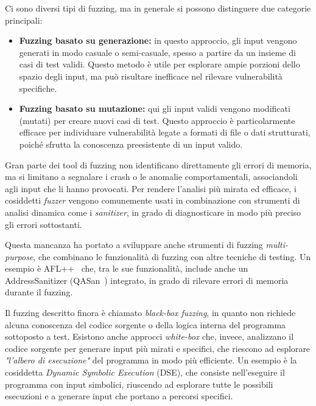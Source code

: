 \smallskip
Ci sono diversi tipi di fuzzing, ma in generale si possono distinguere due
categorie principali:

\begin{itemize}
  \item \textbf{Fuzzing basato su generazione:} in questo approccio, gli input vengono
    generati in modo casuale o semi-casuale, spesso a partire da un insieme di
    casi di test validi. Questo metodo è utile per esplorare ampie porzioni dello
    spazio degli input, ma può risultare inefficace nel rilevare vulnerabilità
    specifiche.

  \item \textbf{Fuzzing basato su mutazione:} qui gli input validi vengono
    modificati (mutati) per creare nuovi casi di test. Questo approccio è particolarmente
    efficace per individuare vulnerabilità legate a formati di file o dati strutturati,
    poiché sfrutta la conoscenza preesistente di un input valido.
\end{itemize}

Gran parte dei tool di fuzzing non identificano direttamente gli errori di memoria,
ma si limitano a segnalare i crash o le anomalie comportamentali, associandoli agli
input che li hanno provocati. Per rendere l'analisi più mirata ed efficace, i cosiddetti
\textit{fuzzer} vengono comunemente usati in combinazione con strumenti di
analisi dinamica come i \textit{sanitizer}, in grado di diagnosticare in modo
più preciso gli errori sottostanti.

Questa mancanza ha portato a sviluppare anche strumenti di fuzzing \textit{multi-purpose},
che combinano le funzionalità di fuzzing con altre tecniche di testing. Un esempio
è AFL++~\cite{afl_plus_plus} che, tra le sue funzionalità, include anche un AddressSanitizer
(QASan~\cite{qasan}) integrato, in grado di rilevare errori di memoria durante
il fuzzing.

Il fuzzing descritto finora è chiamato \textit{black-box fuzzing}, in quanto non
richiede alcuna conoscenza del codice sorgente o della logica interna del
programma sottoposto a test. Esistono anche approcci \textit{white-box} che, invece,
analizzano il codice sorgente per generare input più mirati e specifici, che riescono
ad esplorare \textit{"l'albero di esecuzione"} del programma in modo più
efficiente. Un esempio è la cosiddetta \textit{Dynamic Symbolic Execution} (DSE),
che consiste nell'eseguire il programma con input simbolici, riuscendo ad
esplorare tutte le possibili esecuzioni e a generare input che portano a
percorsi specifici.

